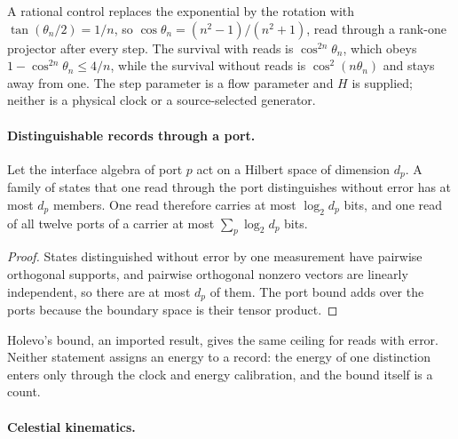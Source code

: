 A rational control replaces the exponential by the rotation with
\(\tan(\theta_n/2)=1/n\), so \(\cos\theta_n=(n^2-1)/(n^2+1)\), read through
a rank-one projector after every step. The survival with reads is
\(\cos^{2n}\theta_n\), which obeys \(1-\cos^{2n}\theta_n\le4/n\), while the
survival without reads is \(\cos^2(n\theta_n)\) and stays away from one.
The step parameter is a flow parameter and \(H\) is supplied; neither is a
physical clock or a source-selected generator.

\paragraph{Distinguishable records through a port.}

\begin{proposition}
\label{prop:port-capacity}
Let the interface algebra of port \(p\) act on a Hilbert space of dimension
\(d_p\). A family of states that one read through the port distinguishes
without error has at most \(d_p\) members. One read therefore carries at most
\(\log_2 d_p\) bits, and one read of all twelve ports of a carrier at most
\(\sum_p\log_2 d_p\) bits.
\end{proposition}

\begin{proof}
States distinguished without error by one measurement have pairwise
orthogonal supports, and pairwise orthogonal nonzero vectors are linearly
independent, so there are at most \(d_p\) of them. The port bound adds over
the ports because the boundary space is their tensor product.
\end{proof}

Holevo's bound, an imported result, gives the same ceiling for reads with
error. Neither statement assigns an energy to a record: the energy of one
distinction enters only through the clock and energy calibration, and the
bound itself is a count.

\paragraph{Celestial kinematics.}


